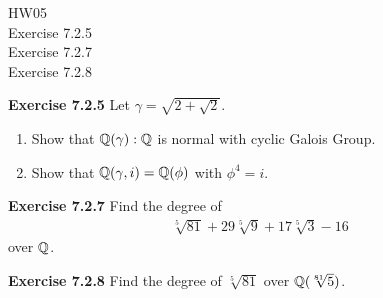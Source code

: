 \documentclass{article}
\begin{document}
\maketitle
HW05 \\
Exercise 7.2.5\\
Exercise 7.2.7\\
Exercise 7.2.8\\
\pagebreak

\begin{homeworkProblem}
    \textbf{Exercise 7.2.5} Let $\gamma = \sqrt{2 + \sqrt{2}}$.
    \begin{enumerate}
        \item Show that $\mathbb{Q}(\gamma):\mathbb{Q}$ is normal with cyclic Galois Group.\\
        \item Show that $\mathbb{Q}(\gamma, i) = \mathbb{Q}(\phi)$ with $\phi^4 = i$.
    \end{enumerate}

    \solution




\end{homeworkProblem}

\pagebreak


\begin{homeworkProblem}
    \textbf{Exercise 7.2.7} Find the degree of 
    \begin{align}
        \sqrt[5]{81} + 29\sqrt[5]{9} + 17\sqrt[5]{3} - 16
    \end{align}
    over $\mathbb{Q}$.

    \solution

\end{homeworkProblem}

\pagebreak

\begin{homeworkProblem}
    \textbf{Exercise 7.2.8} Find the degree of $\sqrt[5]{81}$ over $\mathbb{Q}(\sqrt[81]{5})$.

    \solution

\end{homeworkProblem}
\end{document}
